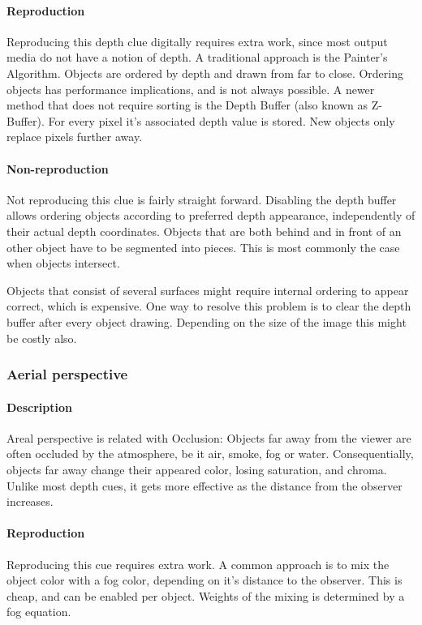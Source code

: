 \paragraph{Reproduction}
Reproducing this depth clue digitally requires extra work, since most output media do not have a notion of depth. A traditional approach is the Painter's Algorithm\cite{painters}. Objects are ordered by depth and drawn from far to close. Ordering objects has performance implications, and is not always possible.
A newer method that does not require sorting is the Depth Buffer\cite{zbuffer} (also known as Z-Buffer). For every pixel it's associated depth value is stored. New objects only replace pixels further away.

\paragraph{Non-reproduction}
Not reproducing this clue is fairly straight forward. Disabling the depth buffer allows ordering objects according to preferred depth appearance, independently of their actual depth coordinates. Objects that are both behind and in front of an other object have to be segmented into pieces. This is most commonly the case when objects intersect.

Objects that consist of several surfaces might require internal ordering to appear correct, which is expensive. One way to resolve this problem is to clear the depth buffer after every object drawing. Depending on the size of the image this might be costly also.


\subsubsection{Aerial perspective}
\paragraph{Description}
Areal perspective is related with Occlusion: Objects far away from the viewer are often occluded by the atmosphere, be it air, smoke, fog or water. Consequentially, objects far away change their appeared color, losing saturation, and chroma.
Unlike most depth cues, it gets more effective as the distance from the observer increases.

\paragraph{Reproduction}
Reproducing this cue requires extra work. A common approach is to mix the object color with a fog color, depending on it's distance to the observer. This is cheap, and can be enabled per object\cite{fog}. Weights of the mixing is determined by a fog equation.

